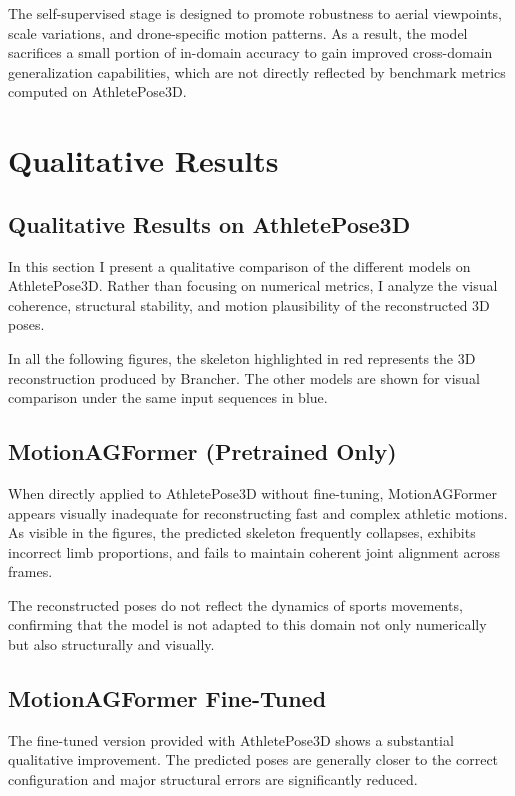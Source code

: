 The self-supervised stage is designed to promote robustness to aerial viewpoints, scale variations, and drone-specific motion patterns. As a result, the model sacrifices a small portion of in-domain 
accuracy to gain improved cross-domain generalization capabilities, which are not directly reflected by benchmark metrics computed on AthletePose3D.

\section{Qualitative Results}
\subsection{Qualitative Results on AthletePose3D}
In this section I present a qualitative comparison of the different models on AthletePose3D. 
Rather than focusing on numerical metrics, I analyze the visual coherence, structural stability, and motion plausibility of the reconstructed 3D poses.

In all the following figures, the skeleton highlighted in {\color{red}red} represents the 3D reconstruction produced by Brancher. The other models are shown for visual comparison under the same 
input sequences in {\color{blue}blue}.

\subsection*{MotionAGFormer (Pretrained Only)}
When directly applied to AthletePose3D without fine-tuning, MotionAGFormer appears visually inadequate for reconstructing fast and complex athletic motions. As visible in the figures, the predicted skeleton 
frequently collapses, exhibits incorrect limb proportions, and fails to maintain coherent joint alignment across frames.

The reconstructed poses do not reflect the dynamics of sports movements, confirming that the model is not adapted to this domain not only numerically but also structurally and visually.

\subsection*{MotionAGFormer Fine-Tuned}
The fine-tuned version provided with AthletePose3D shows a substantial qualitative improvement. The predicted poses are generally closer to the correct configuration and major structural errors are 
significantly reduced.


